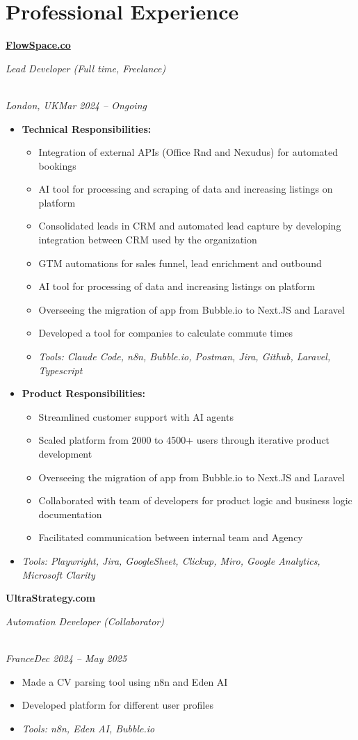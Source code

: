 \documentclass[a4paper,10pt]{article}
\newcommand{\role}[4]{\vspace{3pt}\noindent\hspace{0.6em}\parbox[t]{0.38\textwidth}{\raggedright\textbf{#1}}\hfill\parbox[t]{0.58\textwidth}{\raggedleft\textit{#2}}\\{\textit{#3}\hfill\textit{#4}}\vspace{1pt}}
\begin{document}
\section{Professional Experience}
\role{\href{https://flowspace.co}{FlowSpace.co}}{Lead Developer (Full time, Freelance)}{London, UK}{Mar 2024 -- Ongoing}
\begin{itemize}
\item \textbf{Technical Responsibilities:}
\begin{itemize}[label=--]
\item Integration of external APIs (Office Rnd and Nexudus) for automated bookings
\item AI tool for processing and scraping of data and increasing listings on platform
\item Consolidated leads in CRM and automated lead capture by developing integration between CRM used by the organization
\item GTM automations for sales funnel, lead enrichment and outbound
\item AI tool for processing of data and increasing listings on platform
\item Overseeing the migration of app from Bubble.io to Next.JS and Laravel
\item Developed a tool for companies to calculate commute times
\item \textit{Tools: Claude Code, n8n, Bubble.io, Postman, Jira, Github, Laravel, Typescript}
\end{itemize}
\item \textbf{Product Responsibilities:}
\begin{itemize}[label=--]
\item Streamlined customer support with AI agents
\item Scaled platform from 2000 to 4500+ users through iterative product development
\item Overseeing the migration of app from Bubble.io to Next.JS and Laravel
\item Collaborated with team of developers for product logic and business logic documentation
\item Facilitated communication between internal team and Agency
\end{itemize}
\item \textit{Tools: Playwright, Jira, GoogleSheet, Clickup, Miro, Google Analytics, Microsoft Clarity}
\end{itemize}

\role{UltraStrategy.com}{Automation Developer (Collaborator)}{France}{Dec 2024 -- May 2025}
\begin{itemize}
\item Made a CV parsing tool using n8n and Eden AI
\item Developed platform for different user profiles
\item \textit{Tools: n8n, Eden AI, Bubble.io}
\end{itemize}
\end{document}
